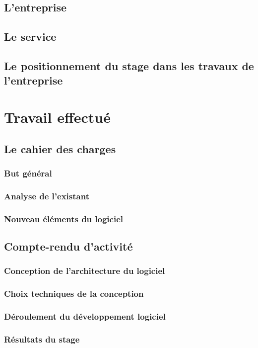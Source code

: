 \documentclass[a4paper, 11pt]{report}
\begin{document}
  \section{L'entreprise}
  \section{Le service}
  \section{Le positionnement du stage dans les travaux de l'entreprise}
\chapter{Travail effectué}
  \section{Le cahier des charges}
    \subsection{But général}
    \subsection{Analyse de l'existant}
    \subsection{Nouveau éléments du logiciel}
  \section{Compte-rendu d'activité}
    \subsection{Conception de l'architecture du logiciel}
    \subsection{Choix techniques de la conception}
    \subsection{Déroulement du développement logiciel}
    \subsection{Résultats du stage}
\end{document}
